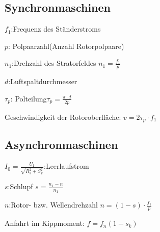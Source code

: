 \documentclass[german]{latex4ei/latex4ei_sheet}
\begin{document}
\begin{sectionbox}
		\subsection{Synchronmaschinen}
			\begin{bluebox}
				\item $f_1$:\quad Frequenz des Ständerstroms
				\item $p$: \quad Polpaarzahl(Anzahl Rotorpolpaare)
				\item $n_1$:\quad Drehzahl des Stratorfeldes $n_1 = \frac{f_1}{p}$
				\item $d$:\quad Luftspaltdurchmesser
				\item $\tau_p$: \quad Polteilung$\tau_p =\frac{\pi \cdot d}{2p}$
				\item Geschwindigkeit der Rotoroberfläche: $v=2\tau_p \cdot f_1$
			\end{bluebox}

		\subsection{Asynchronmaschinen}
			\begin{symbolbox}
				\item $I_0 =\frac{U_1}{\sqrt{R_s^2+S_x^2}}$:\quad Leerlaufstrom
				\item $s$:\quad Schlupf $s = \frac{n_1-n}{n_1}$
				\item $n$:\quad Rotor- bzw. Wellendrehzahl $n = (1-s)\cdot \frac{f_1}{p}$
				\item Anfahrt im Kippmoment: $f = f_n (1-s_k)$
			\end{symbolbox}
	\end{sectionbox}
\end{document}
